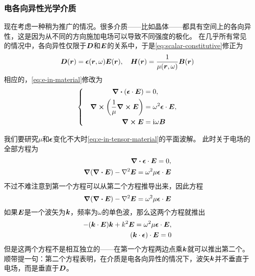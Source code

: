 \documentclass[UTF8, a4paper]{ctexart}
\newcommand*{\ii}{\mathrm{i}}
\newenvironment{bigcase}{\left\{\quad\begin{aligned}}{\end{aligned}\right.}
\begin{document}
\subsubsection{电各向异性光学介质}

现在考虑一种稍为推广的情况。很多介质——比如晶体——都具有空间上的各向异性，这是因为从不同的方向施加电场可以导致不同强度的极化。
在几乎所有常见的情况中，各向异性仅限于$\vb*{D}$和$\vb*{E}$的关系中，于是\eqref{eq:scalar-constitutive}修正为
\begin{equation}
    \vb*{D}(\vb*{r}) = \vb*{\epsilon}(\vb*{r}, \omega) \vb*{E}(\vb*{r}), \quad \vb*{H}(\vb*{r}) = \frac{1}{\mu(\vb*{r}, \omega)} \vb*{B}(\vb*{r})
    \label{eq:e-tensor-constitutive}
\end{equation}
相应的，\eqref{eq:e-in-material}修改为
\begin{equation}
    \begin{bigcase}
        \div{(\vb*{\epsilon} \cdot \vb*{E})} &= 0, \\
        \curl{ \left(\frac{1}{\mu} \curl{\vb*{E}} \right) } &= \omega^2 \vb*{\epsilon} \cdot \vb*{E}, \\
        \curl{\vb*{E}} &= \ii \omega \vb*{B}
    \end{bigcase}
    \label{eq:e-in-tensor-material}
\end{equation}

我们要研究$\mu$和$\vb*{\epsilon}$变化不大时\eqref{eq:e-in-tensor-material}的平面波解。
此时关于电场的全部方程为
\[
    \begin{aligned}
        \div{\vb*{\epsilon} \cdot \vb*{E}} = 0, \\
        \grad{(\div{\vb*{E}})} - \laplacian{\vb*{E}} = \omega^2 \mu \vb*{\epsilon} \cdot \vb*{E}
    \end{aligned}
\]
不过不难注意到第一个方程可以从第二个方程推导出来，因此方程
\begin{equation}
    \grad{(\div{\vb*{E}})} - \laplacian{\vb*{E}} = \omega^2 \mu \vb*{\epsilon} \cdot \vb*{E}
    \label{eq:anisotropy}
\end{equation}
如果$\vb*{E}$是一个波矢为$\vb*{k}$，频率为$\omega$的单色波，那么这两个方程就推出
\[
    \begin{aligned}
        - (\vb*{k} \cdot \vb*{E}) \vb*{k} + k^2 \vb*{E} = \omega^2 \mu \vb*{\epsilon} \cdot \vb*{E}, \\
    (\vb*{k} \cdot \vb*{\epsilon}) \cdot \vb*{E} = 0
    \end{aligned}
\]
但是这两个方程不是相互独立的——在第一个方程两边点乘$\vb*{k}$就可以推出第二个。
顺带提一句：第二个方程表明，在介质是电各向异性的情况下，波矢$\vb*{k}$并不垂直于电场，而是垂直于$\vb*{D}$。
\end{document}
